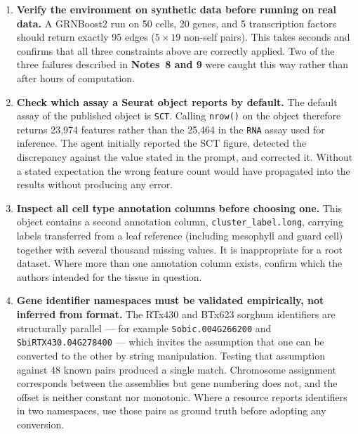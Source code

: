 \documentclass[11pt,a4paper]{article}
\begin{document}
\begin{enumerate}[leftmargin=*]
\item \textbf{Verify the environment on synthetic data before running on real data.} A GRNBoost2 run on 50 cells, 20 genes, and 5 transcription factors should return exactly 95 edges ($5 \times 19$ non-self pairs). This takes seconds and confirms that all three constraints above are correctly applied. Two of the three failures described in \textbf{Notes~8 and 9} were caught this way rather than after hours of computation.

\item \textbf{Check which assay a Seurat object reports by default.} The default assay of the published object is \texttt{SCT}. Calling \texttt{nrow()} on the object therefore returns 23,974 features rather than the 25,464 in the \texttt{RNA} assay used for inference. The agent initially reported the SCT figure, detected the discrepancy against the value stated in the prompt, and corrected it. Without a stated expectation the wrong feature count would have propagated into the results without producing any error.

\item \textbf{Inspect all cell type annotation columns before choosing one.} This object contains a second annotation column, \texttt{cluster\_label.long}, carrying labels transferred from a leaf reference (including mesophyll and guard cell) together with several thousand missing values. It is inappropriate for a root dataset. Where more than one annotation column exists, confirm which the authors intended for the tissue in question.


\item \textbf{Gene identifier namespaces must be validated empirically, not inferred from format.} The RTx430 and BTx623 sorghum identifiers are structurally parallel --- for example \texttt{Sobic.004G266200} and \texttt{SbiRTX430.04G278400} --- which invites the assumption that one can be converted to the other by string manipulation. Testing that assumption against 48 known pairs produced a single match. Chromosome assignment corresponds between the assemblies but gene numbering does not, and the offset is neither constant nor monotonic. Where a resource reports identifiers in two namespaces, use those pairs as ground truth before adopting any conversion.


\end{enumerate}
\end{document}

